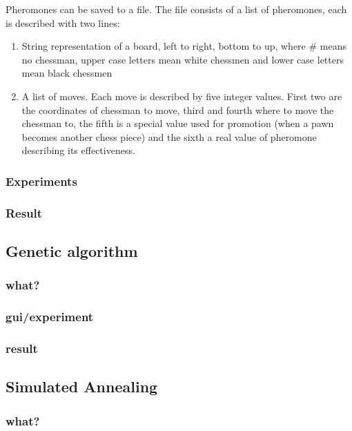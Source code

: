 \documentclass[pdftex]{article}
\begin{document}
Pheromones can be saved to a file. The file consists of a list of pheromones, each is described with two lines:
\begin{enumerate}
 	\item String representation of a board, left to right, bottom to up, where \# means no chessman, upper case letters mean white chessmen and lower case letters mean black chessmen \hfill \\
	\item A list of moves. Each move is described by five integer values. First two are the coordinates of chessman to move, third and fourth where to move the chessman to, the fifth is a special value used for promotion (when a pawn becomes another chess piece) and the sixth a real value of pheromone describing its effectiveness. \hfill \\
\end{enumerate}

\subsubsection{Experiments}

\subsubsection{Result}

\subsection{Genetic algorithm}
\label{sec:genetic}

\subsubsection{what?}
\subsubsection{gui/experiment}
\subsubsection{result}

\subsection{Simulated Annealing}
\label{sec:annealing}

\subsubsection{what?}
\end{document}
